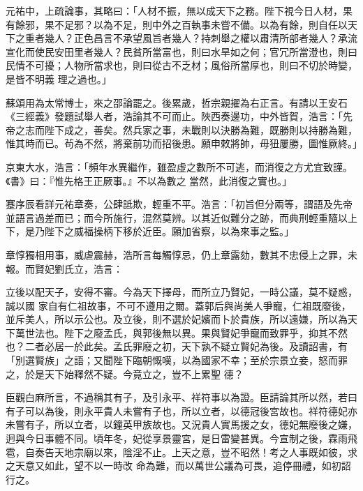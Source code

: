 \begin{pinyinscope}
 元祐中，上疏論事，其略曰：「人材不振，無以成天下之務。陛下視今日人材，果有餘邪，果不足邪？以為不足，則中外之百執事未嘗不備。以為有餘，則自任以天下之重者幾人？正色昌言不承望風旨者幾人？持刺舉之權以肅清所部者幾人？承流宣化而使民安田里者幾人？民貧所當富也，則曰水旱如之何；官冗所當澄也，則曰民情不可擾；人物所當求也，則曰從古不乏材；風俗所當厚也，則曰不切於時變，是皆不明義
 理之過也。」



 蘇頌用為太常博士，來之邵論罷之。後累歲，哲宗親擢為右正言。有請以王安石《三經義》發題試舉人者，浩論其不可而止。陜西奏邊功，中外皆賀，浩言：「先帝之志而陛下成之，善矣。然兵家之事，未戰則以決勝為難，既勝則以持勝為難，惟其時而已。茍為不然，將棄前功而招後患。願申敕將帥，毋狃屢勝，圖惟厥終。」



 京東大水，浩言：「頻年水異繼作，雖盈虛之數所不可逃，而消復之方尤宜致謹。《書》曰：『惟先格王正厥事。』不以為數之
 當然，此消復之實也。」



 蹇序辰看詳元祐章奏，公肆詆欺，輕重不平。浩言：「初旨但分兩等，謂語及先帝並語言過差而已；而今所施行，混然莫辨。以其近似難分之跡，而典刑輕重隨以上下，是乃陛下之威福操柄下移於近臣。願加省察，以為來事之監。」



 章惇獨相用事，威虐震赫，浩所言每觸惇忌，仍上章露劾，數其不忠侵上之罪，未報。而賢妃劉氏立，浩言：



 立後以配天子，安得不審。今為天下擇母，而所立乃賢妃，一時公議，莫不疑惑，誠以國
 家自有仁祖故事，不可不遵用之爾。蓋郭后與尚美人爭寵，仁祖既廢後，並斥美人，所以示公也。及立後，則不選於妃嬪而卜於貴族，所以遠嫌，所以為天下萬世法也。陛下之廢孟氏，與郭後無以異。果與賢妃爭寵而致罪乎，抑其不然也？二者必居一於此矣。孟氏罪廢之初，天下孰不疑立賢妃為後。及讀詔書，有「別選賢族」之語；又聞陛下臨朝慨嘆，以為國家不幸；至於宗景立妾，怒而罪之，於是天下始釋然不疑。今竟立之，豈不上累聖
 德？



 臣觀白麻所言，不過稱其有子，及引永平、祥符事以為證。臣請論其所以然，若曰有子可以為後，則永平貴人未嘗有子也，所以立者，以德冠後宮故也。祥符德妃亦未嘗有子，所以立者，以鐘英甲族故也。又況貴人實馬援之女，德妃無廢後之嫌，迥與今日事體不同。頃年冬，妃從享景靈宮，是日雷變甚異。今宣制之後，霖雨飛雹，自奏告天地宗廟以來，陰淫不止。上天之意，豈不昭然！考之人事既如彼，求之天意又如此，望不以一時改
 命為難，而以萬世公議為可畏，追停冊禮，如初詔行之。




\end{pinyinscope}
